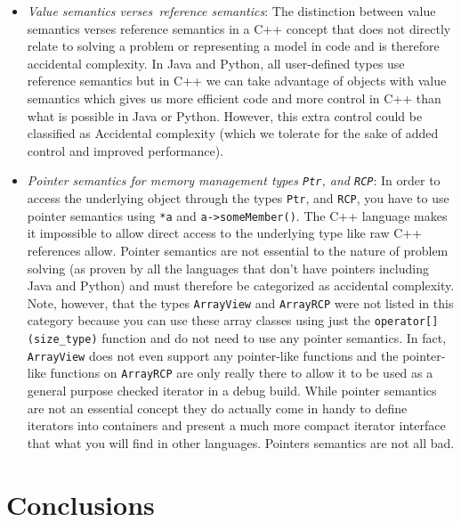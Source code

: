 \documentclass[pdf,ps2pdf,11pt]{SANDreport}
\begin{document}
\begin{itemize}

{}\item\textit{Value semantics verses\ reference semantics}: The
distinction between value semantics verses reference semantics in a
C++ concept that does not directly relate to solving a problem or
representing a model in code and is therefore accidental complexity.
In Java and Python, all user-defined types use reference semantics but
in C++ we can take advantage of objects with value semantics which
gives us more efficient code and more control in C++ than what is
possible in Java or Python.  However, this extra control could be
classified as Accidental complexity (which we tolerate for the sake
of added control and improved performance).

{}\item\textit{Pointer semantics for memory management types
{}\texttt{Ptr}, and {}\texttt{RCP}}: In order to access the underlying
object through the types {}\texttt{Ptr}, and {}\texttt{RCP}, you have
to use pointer semantics using {}\texttt{*a} and
{}\texttt{a->someMember()}.  The C++ language makes it impossible to
allow direct access to the underlying type like raw C++ references
allow.  Pointer semantics are not essential to the nature of problem
solving (as proven by all the languages that don't have pointers
including Java and Python) and must therefore be categorized as
accidental complexity.  Note, however, that the types
{}\texttt{ArrayView} and {}\texttt{ArrayRCP} were not listed in this
category because you can use these array classes using just the
{}\texttt{operator[](size\_type)} function and do not need to use any
pointer semantics.  In fact, {}\texttt{ArrayView} does not even
support any pointer-like functions and the pointer-like functions on
{}\texttt{ArrayRCP} are only really there to allow it to be used as a
general purpose checked iterator in a debug build.  While pointer
semantics are not an essential concept they do actually come in handy
to define iterators into containers and present a much more compact
iterator interface that what you will find in other languages.
Pointers semantics are not all bad.

\end{itemize}

%
{}\section{Conclusions}
\label{sec:conclusions}
%
\end{document}
